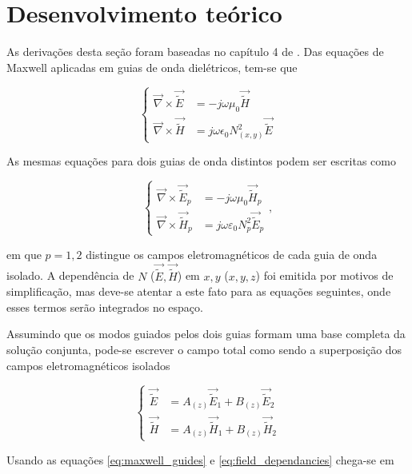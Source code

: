 \documentclass[final,12pt,times,twocolumn]{elsarticle}
\newcommand{\diverg}{\vec{\nabla}}
\newcommand{\tildee}{ \vec{\tilde{E}}}
\newcommand{\tildeh}{ \vec{\tilde{H}}}
\newcommand{\epsz}{\varepsilon_0}
\newcommand{\muz}{\mu_0}
\begin{document}
\section{Desenvolvimento teórico}
\label{sec:teoria}

As derivações desta seção foram baseadas no capítulo 4 de \cite{okamoto}. Das equações de Maxwell aplicadas em guias de onda dielétricos, tem-se que

\begin{equation}
    \left\{
    \begin{split}
        \diverg \times \tildee &= -j\omega\mu_0\tildeh \\
        \diverg\times \tildeh &= j\omega\epsilon_0N_{(x,y)}^2\tildee
    \end{split}\right.
    \label{eq:maxwell_guides}
\end{equation}

As mesmas equações para dois guias de onda distintos podem ser escritas como

\begin{equation}
    \left\{
    \begin{split}
        \diverg \times \tildee_p &= -j\omega\muz\tildeh_p \\
        \diverg\times \tildeh_p &= j\omega\epsz N_p^2\tildee_p
    \end{split}\right. ,
    \label{eq:maxwell_pguides}
\end{equation}

\noindent em que $p=1,2$ distingue os campos eletromagnéticos de cada guia de onda isolado. A dependência de $N$ ($\tildee,\tildeh$) em $x,y$ ($x,y,z$) foi emitida por motivos de simplificação, mas deve-se atentar a este fato para as equações seguintes, onde esses termos serão integrados no espaço.

Assumindo que os modos guiados pelos dois guias formam uma base completa da solução conjunta, pode-se escrever o campo total como sendo a superposição dos campos eletromagnéticos isolados

\begin{equation}
    \left\{
    \begin{split}
        \tildee &= A_{(z)}\tildee_1 + B_{(z)}\tildee_2 \\
        \tildeh &= A_{(z)}\tildeh_1 + B_{(z)}\tildeh_2
    \end{split}
    \right.
    \label{eq:field_dependancies}
\end{equation}

Usando as equações \eqref{eq:maxwell_guides} e \eqref{eq:field_dependancies} chega-se em
\end{document}
